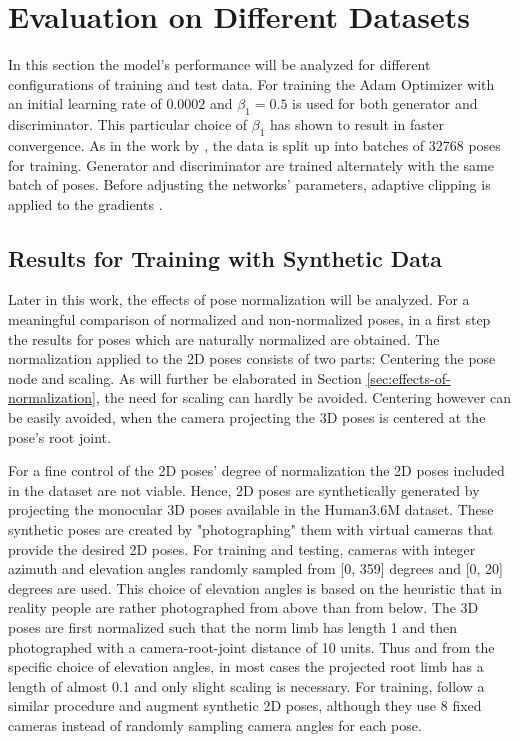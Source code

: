 \section{Evaluation on Different Datasets}
\label{sec:evaluation}

In this section the model's performance will be analyzed for different configurations of training and test data.
For training the Adam Optimizer \cite{kingma17} with an initial learning rate of $0.0002$ and $\beta_1 = 0.5$ is used for both generator and discriminator.
This particular choice of $\beta_1$ has shown to result in faster convergence.
As in the work by \citet{drover18}, the data is split up into batches of 32768 poses for training.
Generator and discriminator are trained alternately with the same batch of poses.
Before adjusting the networks' parameters, adaptive clipping is applied to the gradients \cite[Section~3.2.1]{chorowski14}.


\subsection{Results for Training with Synthetic Data}

Later in this work, the effects of pose normalization will be analyzed.
For a meaningful comparison of normalized and non-normalized poses, in a first step the results for poses which are naturally normalized are obtained.
The normalization applied to the 2D poses consists of two parts: Centering the pose node and scaling.
As will further be elaborated in Section \ref{sec:effects-of-normalization}, the need for scaling can hardly be avoided.
Centering however can be easily avoided, when the camera projecting the 3D poses is centered at the pose's root joint.

For a fine control of the 2D poses' degree of normalization the 2D poses included in the dataset are not viable.
Hence, 2D poses are synthetically generated by projecting the monocular 3D poses available in the Human3.6M dataset.
These synthetic poses are created by "photographing" them with virtual cameras that provide the desired 2D poses.
For training and testing, cameras with integer azimuth and elevation angles randomly sampled from [0, 359] degrees and [0, 20] degrees are used.
This choice of elevation angles is based on the heuristic that in reality people are rather photographed from above than from below.
The 3D poses are first normalized such that the norm limb has length 1 and then photographed with a camera-root-joint distance of 10 units.
Thus and from the specific choice of elevation angles, in most cases the projected root limb has a length of almost 0.1 and only slight scaling is necessary.
For training, \citet{drover18} follow a similar procedure and augment synthetic 2D poses, although they use 8 fixed cameras instead of randomly sampling camera angles for each pose.

